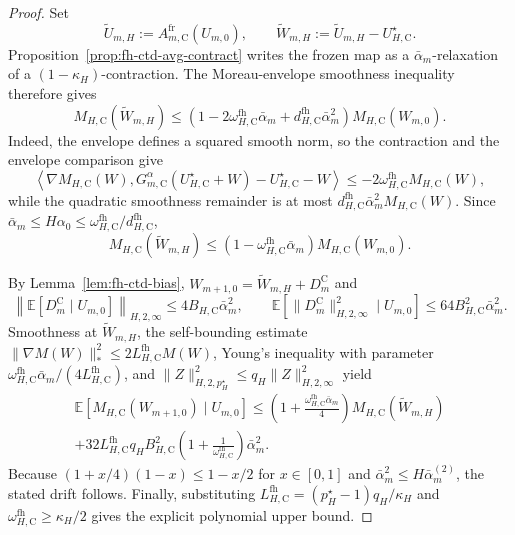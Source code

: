 \documentclass{article}
\begin{document}
\begin{proof}
Set
\begin{equation}
\widetilde U_{m,H}:=A_{m,\mathrm C}^{\mathrm{fr}}(U_{m,0}),\qquad \widetilde W_{m,H}:=\widetilde U_{m,H}-U_{H,\mathrm C}^\star.
\end{equation}
Proposition~\ref{prop:fh-ctd-avg-contract} writes the frozen map as a $\bar\alpha_m$-relaxation of a $(1-\kappa_H)$-contraction. The Moreau-envelope smoothness inequality therefore gives
\begin{equation}
M_{H,\mathrm C}(\widetilde W_{m,H})\le\left(1-2\omega_{H,\mathrm C}^{\mathrm{fh}}\bar\alpha_m+d_{H,\mathrm C}^{\mathrm{fh}}\bar\alpha_m^2\right)M_{H,\mathrm C}(W_{m,0}).
\end{equation}
Indeed, the envelope defines a squared smooth norm, so the contraction and the envelope comparison give
\begin{equation}
\left\langle\nabla M_{H,\mathrm C}(W),G_{m,\mathrm C}^\alpha(U_{H,\mathrm C}^\star+W)-U_{H,\mathrm C}^\star-W\right\rangle\le-2\omega_{H,\mathrm C}^{\mathrm{fh}}M_{H,\mathrm C}(W),
\end{equation}
while the quadratic smoothness remainder is at most $d_{H,\mathrm C}^{\mathrm{fh}}\bar\alpha_m^2M_{H,\mathrm C}(W)$. Since $\bar\alpha_m\le H\alpha_0\le\omega_{H,\mathrm C}^{\mathrm{fh}}/d_{H,\mathrm C}^{\mathrm{fh}}$,
\begin{equation}
M_{H,\mathrm C}(\widetilde W_{m,H})\le\left(1-\omega_{H,\mathrm C}^{\mathrm{fh}}\bar\alpha_m\right)M_{H,\mathrm C}(W_{m,0}).
\end{equation}

By Lemma~\ref{lem:fh-ctd-bias}, $W_{m+1,0}=\widetilde W_{m,H}+D_m^{\mathrm C}$ and
\begin{equation}
\left\lVert\mathbb E[D_m^{\mathrm C}\mid U_{m,0}]\right\rVert_{H,2,\infty}\le4B_{H,\mathrm C}\bar\alpha_m^2,\qquad \mathbb E\left[\lVert D_m^{\mathrm C}\rVert_{H,2,\infty}^2\mid U_{m,0}\right]\le64B_{H,\mathrm C}^2\bar\alpha_m^2.
\end{equation}
Smoothness at $\widetilde W_{m,H}$, the self-bounding estimate $\lVert\nabla M(W)\rVert_*^2\le2L_{H,\mathrm C}^{\mathrm{fh}}M(W)$, Young's inequality with parameter $\omega_{H,\mathrm C}^{\mathrm{fh}}\bar\alpha_m/(4L_{H,\mathrm C}^{\mathrm{fh}})$, and $\lVert Z\rVert_{H,2,p_H^\star}^2\le q_H\lVert Z\rVert_{H,2,\infty}^2$ yield
\begin{equation}
\begin{gathered}
\mathbb E\left[M_{H,\mathrm C}(W_{m+1,0})\mid U_{m,0}\right]\le\left(1+\frac{\omega_{H,\mathrm C}^{\mathrm{fh}}\bar\alpha_m}{4}\right)M_{H,\mathrm C}(\widetilde W_{m,H})\\
+32L_{H,\mathrm C}^{\mathrm{fh}}q_HB_{H,\mathrm C}^2\left(1+\frac{1}{\omega_{H,\mathrm C}^{\mathrm{fh}}}\right)\bar\alpha_m^2.
\end{gathered}
\end{equation}
Because $(1+x/4)(1-x)\le1-x/2$ for $x\in[0,1]$ and $\bar\alpha_m^2\le H\bar\alpha_m^{(2)}$, the stated drift follows. Finally, substituting $L_{H,\mathrm C}^{\mathrm{fh}}=(p_H^\star-1)q_H/\kappa_H$ and $\omega_{H,\mathrm C}^{\mathrm{fh}}\ge\kappa_H/2$ gives the explicit polynomial upper bound.
\end{proof}
\end{document}
